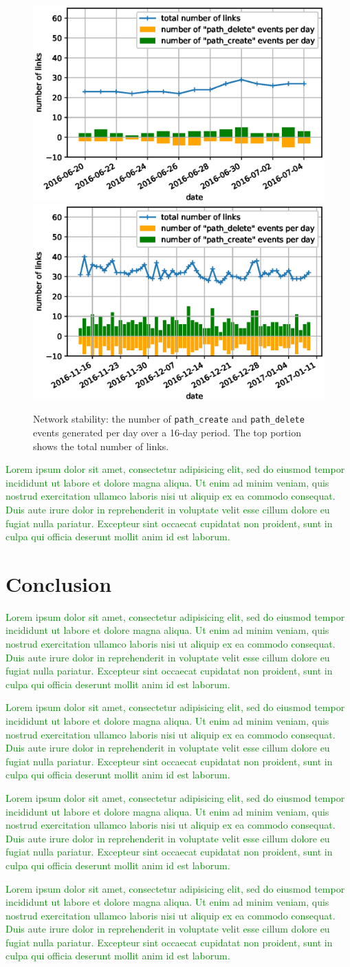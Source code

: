 \documentclass{elsarticle}
\newcommand{\lorem}          {\textcolor{green}{Lorem ipsum dolor sit amet, consectetur adipisicing elit, sed do eiusmod tempor incididunt ut labore et dolore magna aliqua. Ut enim ad minim veniam, quis nostrud exercitation ullamco laboris nisi ut aliquip ex ea commodo consequat. Duis aute irure dolor in reprehenderit in voluptate velit esse cillum dolore eu fugiat nulla pariatur. Excepteur sint occaecat cupidatat non proident, sunt in culpa qui officia deserunt mollit anim id est laborum.}}
\newcommand{\pathcreate}          {{\tt path\_create}\xspace}
\newcommand{\pathdelete}          {{\tt path\_delete}\xspace}
\begin{document}
\begin{figure}
    \includegraphics[width=0.5\columnwidth]{net_churn_peach.eps}
    \includegraphics[width=0.5\columnwidth]{net_churn.eps}
    \caption{
        Network stability: the number of \pathcreate and \pathdelete events generated per day over a 16-day period.
        The top portion shows the total number of links.
    }
    \label{fig:net_churn}
\end{figure}


\lorem

\section{Conclusion}
\label{sec:conclusion}


\lorem


\lorem


\lorem


\lorem

%
%
\end{document}
